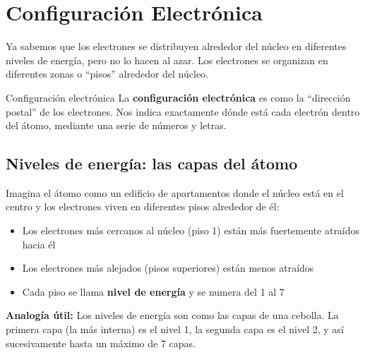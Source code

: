 \section{Configuración Electrónica}
Ya sabemos que los electrones se distribuyen alrededor del núcleo en diferentes niveles de energía, pero no lo hacen al azar. Los electrones se organizan en diferentes zonas o ``pisos'' alrededor del núcleo.
\begin{definition}{Configuración electrónica}
    La \textbf{configuración electrónica} es como la ``dirección postal'' de los electrones. Nos indica exactamente dónde está cada electrón dentro del átomo, mediante una serie de números y letras.
\end{definition}
\newpage

\subsection{Niveles de energía: las capas del átomo}
\begin{minipage}{0.45\textwidth}
    Imagina el átomo como un edificio de apartamentos donde el núcleo está en el centro y los electrones viven en diferentes pisos alrededor de él:
    \begin{itemize}
        \item Los electrones más cercanos al núcleo (piso 1) están más fuertemente atraídos hacia él
        \item Los electrones más alejados (pisos superiores) están menos atraídos
        \item Cada piso se llama \textbf{nivel de energía} y se numera del 1 al 7
    \end{itemize}
    \begin{remark}
        \textbf{Analogía útil:} Los niveles de energía son como las capas de una cebolla. La primera capa (la más interna) es el nivel 1, la segunda capa es el nivel 2, y así sucesivamente hasta un máximo de 7 capas.
    \end{remark}
\end{minipage}
\hfill
